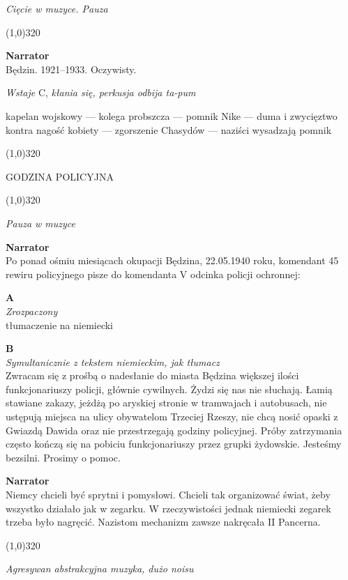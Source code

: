 \documentclass[11pt,a4paper,oneside]{article}
\begin{document}
{\color{light-gray} \emph{Cięcie w muzyce. Pauza}}


\line(1,0){320}


\textbf{Narrator}\\
Będzin. 1921--1933. Oczywisty. 

{\color{light-gray} \emph{Wstaje} C, \emph{kłania się, perkusja odbija
ta-pum}}

{\color{red} kapelan wojskowy --- kolega probszcza --- pomnik Nike --- duma
i zwycięztwo kontra nagość kobiety --- zgorszenie Chasydów --- naziści
wysadzają pomnik}

\line(1,0){320}

{\color{red}
GODZINA POLICYJNA
}

\line(1,0){320}

{\color{light-gray} \emph{Pauza w muzyce}}

\textbf{Narrator}\\
Po ponad ośmiu miesiącach okupacji Będzina, 22.05.1940 roku, komendant 45
rewiru policyjnego pisze do komendanta V odcinka policji ochronnej:

\textbf{A}\\
{\color{light-gray} \emph{Zrozpaczony}}\\
{\color{red} tłumaczenie na niemiecki}


\textbf{B}\\
{\color{light-gray} \emph{Symultanicznie z tekstem niemieckim, jak tłumacz}}\\
Zwracam się z prośbą o nadesłanie do miasta Będzina większej ilości
funkcjonariuszy policji, głównie cywilnych. Żydzi się nas nie słuchają. Łamią
stawiane zakazy, jeżdżą po aryskiej stronie w tramwajach i autobusach, nie
ustępują miejsca na ulicy obywatelom Trzeciej Rzeszy, nie chcą nosić opaski
z Gwiazdą Dawida oraz nie przestrzegają godziny policyjnej. Próby zatrzymania
często kończą się na pobiciu funkcjonariuszy przez grupki żydowskie. Jesteśmy 
bezsilni. Prosimy o pomoc.


\textbf{Narrator}\\
Niemcy chcieli być sprytni i pomysłowi. Chcieli tak organizować świat, 
żeby wszystko działało jak w zegarku. W rzeczywistości jednak niemiecki 
zegarek trzeba było nagręcić. Nazistom mechanizm zawsze nakręcała
II Pancerna. 

\line(1,0){320}

{\color{light-gray} \emph{Agresywan abstrakcyjna muzyka, dużo noisu}}
\end{document}

